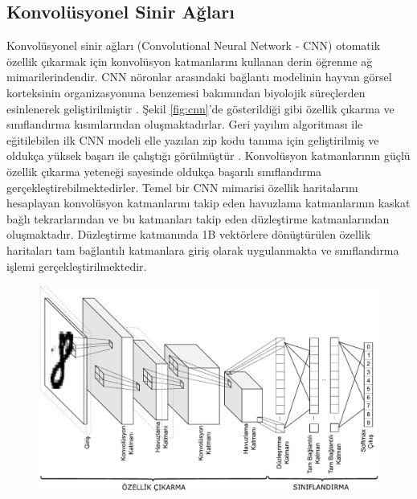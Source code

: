 \subsection{Konvolüsyonel Sinir Ağları}
Konvolüsyonel sinir ağları (Convolutional Neural Network - CNN) otomatik özellik çıkarmak için konvolüsyon katmanlarını kullanan derin öğrenme ağ mimarilerindendir. CNN nöronlar arasındaki bağlantı modelinin hayvan görsel korteksinin organizasyonuna benzemesi bakımından biyolojik süreçlerden esinlenerek geliştirilmiştir \cite{hubel1968receptive,fukushima1983neocognitron,matsugu2003subject}. Şekil \ref{fig:cnn}'de gösterildiği gibi özellik çıkarma ve sınıflandırma kısımlarından oluşmaktadırlar. Geri yayılım algoritması ile eğitilebilen ilk CNN modeli elle yazılan zip kodu tanıma için geliştirilmiş ve oldukça yüksek başarı ile çalıştığı görülmüştür \cite{lecun1989backpropagation}. Konvolüsyon katmanlarının güçlü özellik çıkarma yeteneği sayesinde oldukça başarılı sınıflandırma gerçekleştirebilmektedirler. Temel bir CNN mimarisi özellik haritalarını hesaplayan konvolüsyon katmanlarını takip eden havuzlama katmanlarının kaskat bağlı tekrarlarından ve bu katmanları takip eden düzleştirme katmanlarından oluşmaktadır. Düzleştirme katmanında 1B vektörlere dönüştürülen özellik haritaları tam bağlantılı katmanlara giriş olarak uygulanmakta ve sınıflandırma işlemi gerçekleştirilmektedir. 

\begin{figure}[h!]
	\begin{center}
		\vspace{0.4cm}
		{
			\vspace{0.4cm}
			\includegraphics[scale=0.75]{Yapilan-Calismalar/Figures/cnn.pdf}
		}
	\end{center}
\end{figure}

